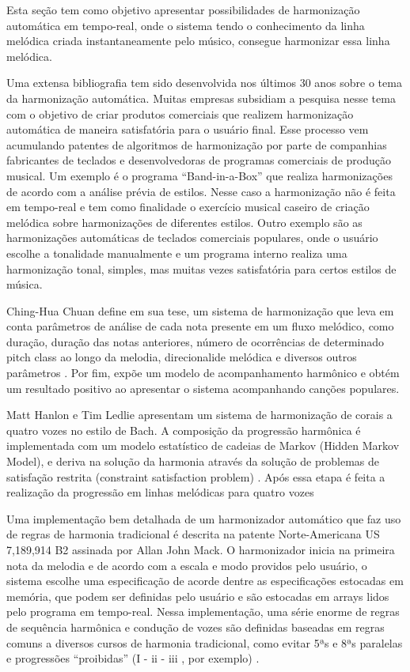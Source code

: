 \documentclass{ppgmus}
\begin{document}
Esta seção tem como objetivo apresentar possibilidades de harmonização automática em tempo-real,
onde o sistema tendo o conhecimento da linha melódica criada instantaneamente pelo músico, consegue
harmonizar essa linha melódica.

Uma extensa bibliografia tem sido desenvolvida nos últimos 30 anos sobre o tema da harmonização automática.
Muitas empresas subsidiam a pesquisa nesse tema com o objetivo de criar produtos comerciais que realizem
harmonização automática de maneira satisfatória para o usuário final. Esse processo vem acumulando patentes
de algoritmos de harmonização por parte de companhias fabricantes de teclados e desenvolvedoras de programas comerciais
de produção musical. Um exemplo é o programa ``Band-in-a-Box'' que realiza harmonizações de acordo com
a análise prévia de estilos. Nesse caso a harmonização não é feita em tempo-real e tem como finalidade
o exercício musical caseiro de criação melódica sobre harmonizações de diferentes estilos.
Outro exemplo são as harmonizações automáticas de teclados comerciais populares, onde o usuário escolhe
a tonalidade manualmente e um programa interno realiza uma harmonização tonal, simples, mas muitas vezes 
satisfatória para certos estilos de música.


Ching-Hua Chuan define em sua tese, um sistema de harmonização que leva em conta parâmetros
de análise de cada nota presente em um fluxo melódico, como duração, duração das notas anteriores, número
de ocorrências de determinado pitch class ao longo da melodia, direcionalide melódica e diversos outros
parâmetros \cite{chuan2008}. Por fim, expõe um modelo de acompanhamento harmônico e obtém um resultado positivo ao apresentar
o sistema acompanhando canções populares.

Matt Hanlon e Tim Ledlie apresentam um sistema de harmonização de corais a quatro vozes no estilo de Bach.
A composição da progressão harmônica é implementada com um modelo estatístico de cadeias de Markov
(Hidden Markov Model), e deriva na solução da harmonia através da solução de problemas
de satisfação restrita (constraint satisfaction problem) \cite{cpubach}. Após
essa etapa é feita a realização da progressão em linhas melódicas para quatro vozes

Uma implementação bem detalhada de um harmonizador automático que faz uso de
 regras de harmonia tradicional é descrita na patente Norte-Americana 
US 7,189,914 B2  assinada por Allan John Mack. O harmonizador inicia
na primeira nota da melodia e de acordo com a escala e modo providos
pelo usuário, o sistema escolhe uma especificação de acorde dentre
as especificações estocadas em memória, que podem ser definidas pelo usuário
e são estocadas em arrays lidos pelo programa em tempo-real.
Nessa implementação, uma série enorme de regras de sequência harmônica e 
condução de vozes são definidas baseadas em regras comuns a diversos cursos
de harmonia tradicional, como evitar 5ªs e 8ªs paralelas e progressões
``proibidas'' (I - ii - iii , por exemplo) \cite{patente:harmonizador}.
\end{document}
